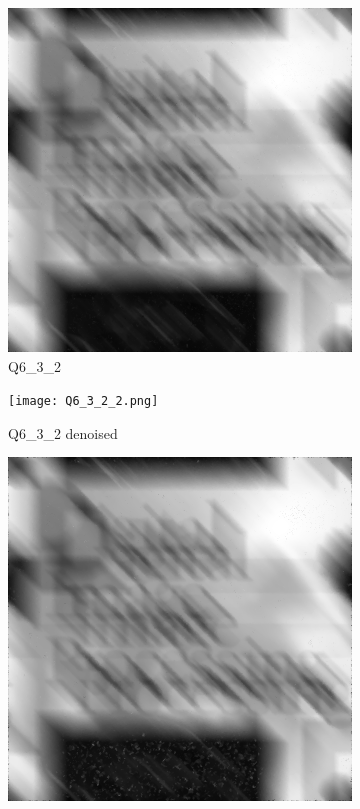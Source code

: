\documentclass[
	12pt, %
]{style/fphw}
\begin{document}
	\begin{figure}[H]
		\centering
		\begin{subfigure}[b]{.24\textwidth}
			\centering
			\includegraphics[width=0.9\linewidth]{Q6_3_2.png}
			\caption{Q6\_3\_2}
			\label{Q6_3_2}
		\end{subfigure}
		\hfill
		\begin{subfigure}[b]{.24\textwidth}
			\centering
			\texttt{[image: Q6\_3\_2\_2.png]}
			\caption{Q6\_3\_2 denoised}
			\label{Q6_3_2_2}
		\end{subfigure}
		\hfill
		\begin{subfigure}[b]{.24\textwidth}
			\centering
			\includegraphics[width=0.9\linewidth]{Q6_3_3.png}

\end{subfigure}
\end{figure}
\end{document}
